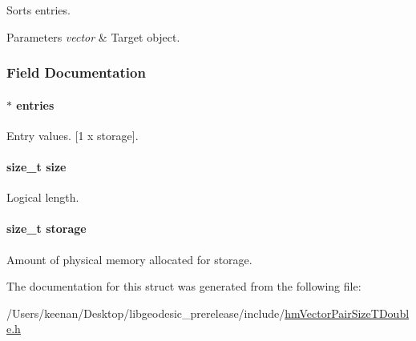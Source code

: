 Sorts entries. 


\begin{DoxyParams}{Parameters}
{\em vector} & Target object. \\
\hline
\end{DoxyParams}


\subsubsection{Field Documentation}
\hypertarget{structhm_vector_pair_size_t_double_abf41d9d474c700f3b5ca2400cf24801e}{
\paragraph[{entries}]{$\ast$ entries}}\label{structhm_vector_pair_size_t_double_abf41d9d474c700f3b5ca2400cf24801e}


Entry values. \mbox{[}1 x storage\mbox{]}. 

\hypertarget{structhm_vector_pair_size_t_double_a854352f53b148adc24983a58a1866d66}{
\paragraph[{size}]{\setlength{\rightskip}{0pt plus 5cm}size\-\_\-t size}}\label{structhm_vector_pair_size_t_double_a854352f53b148adc24983a58a1866d66}


Logical length. 

\hypertarget{structhm_vector_pair_size_t_double_ad69ae78713b41381c4d71371aae6e63e}{
\paragraph[{storage}]{\setlength{\rightskip}{0pt plus 5cm}size\-\_\-t storage}}\label{structhm_vector_pair_size_t_double_ad69ae78713b41381c4d71371aae6e63e}


Amount of physical memory allocated for storage. 



The documentation for this struct was generated from the following file\-:\begin{DoxyCompactItemize}
\item 
/\-Users/keenan/\-Desktop/libgeodesic\-\_\-prerelease/include/\hyperlink{hm_vector_pair_size_t_double_8h}{hm\-Vector\-Pair\-Size\-T\-Double.\-h}\end{DoxyCompactItemize}
